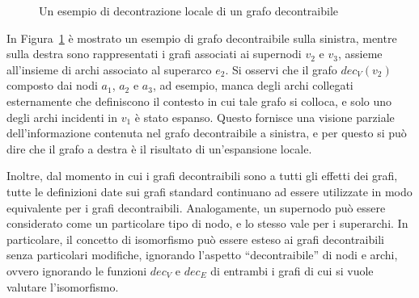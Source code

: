 \begin{figure}[h!]
\centering

\vspace{-15pt}
\caption{Un esempio di decontrazione locale di un grafo decontraibile}
\label{fig:dec-graph-example}
\end{figure}

In Figura~\ref{fig:dec-graph-example} \`e mostrato un esempio di grafo decontraibile sulla sinistra, mentre sulla
destra sono rappresentati i grafi associati ai supernodi $v_2$ e $v_3$, assieme all'insieme di archi associato
al superarco $e_2$.
Si osservi che il grafo $dec_V(v_2)$ composto dai nodi $a_1$, $a_2$ e $a_3$, ad esempio, manca degli archi collegati
esternamente che definiscono il contesto in cui tale grafo si colloca, e solo uno degli archi incidenti
in $v_1$ \`e stato espanso.
Questo fornisce una visione parziale dell'informazione contenuta nel grafo decontraibile a sinistra,
e per questo si pu\`o dire che il grafo a destra \`e il risultato di un'espansione locale. \newline

Inoltre, dal momento in cui i grafi decontraibili sono a tutti gli effetti dei grafi, tutte le
definizioni date sui grafi standard continuano ad essere utilizzate in modo equivalente per i grafi decontraibili.
Analogamente, un supernodo pu\`o essere considerato come un particolare tipo di nodo, e lo stesso vale per i
superarchi.
In particolare, il concetto di isomorfismo pu\`o essere esteso ai grafi decontraibili senza particolari modifiche,
ignorando l'aspetto ``decontraibile'' di nodi e archi, ovvero ignorando le funzioni $dec_V$ e $dec_E$ di entrambi
i grafi di cui si vuole valutare l'isomorfismo.



